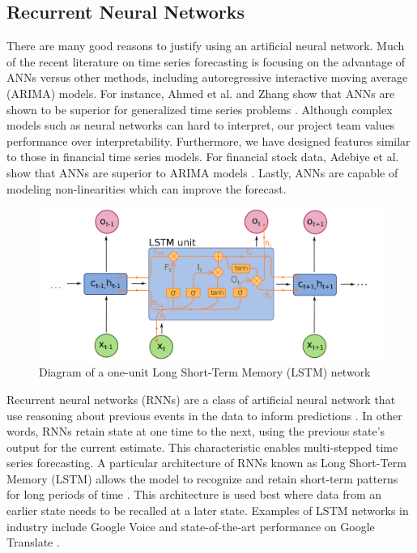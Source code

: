 \documentclass[11pt, oneside, authoryear]{report}
\begin{document}
\subsection{Recurrent Neural Networks}

There are many good reasons to justify using an artificial neural network. Much of the recent literature on time series forecasting is focusing on the advantage of ANNs versus other methods, including autoregressive interactive moving average (ARIMA) models. For instance, Ahmed et al. and Zhang show that ANNs are shown to be superior for generalized time series problems \citep{ahmed}. Although complex models such as neural networks can hard to interpret, our project team values performance over interpretability. Furthermore, we have designed features similar to those in financial time series models. For financial stock data, Adebiye et al. show that ANNs are superior to ARIMA models \citep{adebiye}. Lastly, ANNs are capable of modeling non-linearities which can improve the forecast.

\begin{figure}[h]
  \caption{Diagram of a one-unit Long Short-Term Memory (LSTM) network \citep{deloche}}
  \centering
  \includegraphics[width=12.5cm]{images/Long_Short-Term_Memory.png}
\end{figure}

Recurrent neural networks (RNNs) are a class of artificial neural network that use reasoning about previous events in the data to inform predictions \citep{olah}. In other words, RNNs retain state at one time to the next, using the previous state's output for the current estimate. This characteristic enables multi-stepped time series forecasting. A particular architecture of RNNs known as Long Short-Term Memory (LSTM) allows the model to recognize and retain short-term patterns for long periods of time \citep{hochreiter}. This architecture is used best where data from an earlier state needs to be recalled at a later state. Examples of LSTM networks in industry include Google Voice \citep{beaufays} and state-of-the-art performance on Google Translate \citep{le}.
\end{document}
